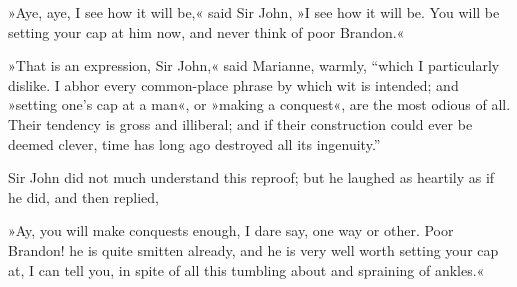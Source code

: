 »Aye, aye, I see how it will be,« said Sir John, »I see how it will be. You will be setting your cap at him now, and never think of poor Brandon.«

»That is an expression, Sir John,« said Marianne, warmly, “which I particularly dislike. I abhor every common-place phrase by which wit is intended; and »setting one’s cap at a man«, or »making a conquest«, are the most odious of all. Their tendency is gross and illiberal; and if their construction could ever be deemed clever, time has long ago destroyed all its ingenuity.”

Sir John did not much understand this reproof; but he laughed as heartily as if he did, and then replied,

»Ay, you will make conquests enough, I dare say, one way or other. Poor Brandon! he is quite smitten already, and he is very well worth setting your cap at, I can tell you, in spite of all this tumbling about and spraining of ankles.«